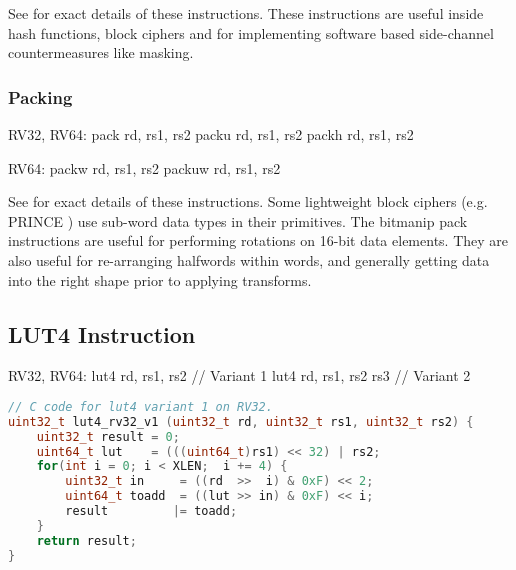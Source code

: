 See \cite[Section 2.1.3]{riscv:bitmanip:draft} for exact details of
these instructions.
These instructions are useful inside hash functions, block ciphers and
for implementing software based side-channel countermeasures like masking.


\subsubsection{Packing}

\begin{isa}
RV32, RV64: 
    pack   rd, rs1, rs2
    packu  rd, rs1, rs2
    packh  rd, rs1, rs2

RV64: 
    packw  rd, rs1, rs2
    packuw rd, rs1, rs2
\end{isa}

See \cite[Section 2.1.4]{riscv:bitmanip:draft} for exact details of
these instructions.
Some lightweight block ciphers (e.g. PRINCE \cite{block:prince}) use
sub-word data types in their primitives.
The bitmanip pack instructions are useful for performing rotations on
16-bit data elements.
They are also useful for re-arranging halfwords within words, and
generally getting data into the right shape prior to applying transforms.




\subsection{LUT4 Instruction}

\begin{isa}
RV32, RV64:
    lut4    rd, rs1, rs2        // Variant 1
    lut4    rd, rs1, rs2 rs3    // Variant 2
\end{isa}

\begin{lstlisting}[language=c]
// C code for lut4 variant 1 on RV32.
uint32_t lut4_rv32_v1 (uint32_t rd, uint32_t rs1, uint32_t rs2) {
    uint32_t result = 0;
    uint64_t lut    = (((uint64_t)rs1) << 32) | rs2;
    for(int i = 0; i < XLEN;  i += 4) {
        uint32_t in     = ((rd  >>  i) & 0xF) << 2;
        uint64_t toadd  = ((lut >> in) & 0xF) << i;
        result         |= toadd;
    }
    return result;
}
\end{lstlisting}

